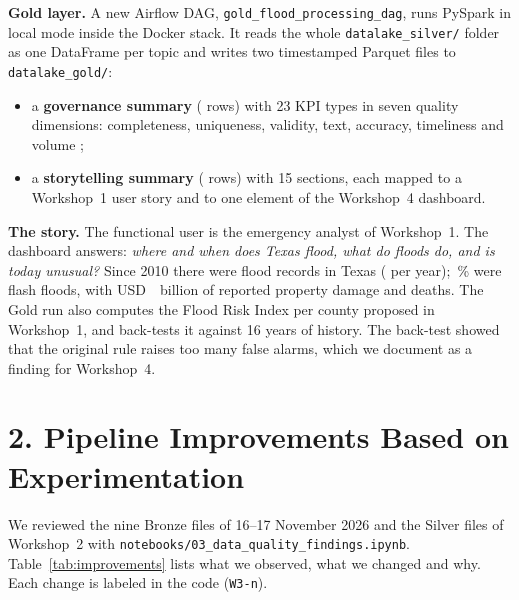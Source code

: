 \documentclass[stu, 12pt, letterpaper, donotrepeattitle, floatsintext, natbib]{apa7}
\begin{document}
\textbf{Gold layer.} A new Airflow DAG, \texttt{gold\_flood\_processing\_dag}, runs PySpark in local mode inside the Docker stack. It reads the whole \texttt{datalake\_silver/} folder as one DataFrame per topic and writes two timestamped Parquet files to \texttt{datalake\_gold/}:
\begin{itemize}
    \item a \textbf{governance summary} (\GovRows{} rows) with 23 KPI types in seven quality dimensions: completeness, uniqueness, validity, text, accuracy, timeliness and volume \citep{wang1996, batini2009};
    \item a \textbf{storytelling summary} (\StoryRows{} rows) with 15 sections, each mapped to a Workshop~1 user story and to one element of the Workshop~4 dashboard.
\end{itemize}

\textbf{The story.} The functional user is the emergency analyst of Workshop~1. The dashboard answers: \emph{where and when does Texas flood, what do floods do, and is today unusual?} Since 2010 there were \EventsTotal{} flood records in Texas (\EventsPerYear{} per year); \FlashShare\,\% were flash floods, with USD~\DamageBn{}~billion of reported property damage and \Deaths{} deaths. The Gold run also computes the Flood Risk Index per county proposed in Workshop~1, and back-tests it against 16 years of history. The back-test showed that the original rule raises too many false alarms, which we document as a finding for Workshop~4.

\section{\large 2. Pipeline Improvements Based on Experimentation}
We reviewed the nine Bronze files of 16--17 November 2026 and the Silver files of Workshop~2 with \texttt{notebooks/03\_data\_quality\_findings.ipynb}. Table~\ref{tab:improvements} lists what we observed, what we changed and why. Each change is labeled in the code (\texttt{W3-n}).
\end{document}
